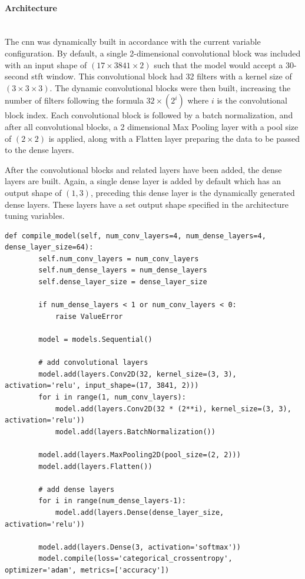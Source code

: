 \documentclass[12pt]{article}
\begin{document}
\paragraph{Architecture}\mbox{}\\


The \acrshort{cnn} was dynamically built in accordance with the current variable configuration. By default, a single 2-dimensional convolutional block was included with an input shape of $(17\times3841\times2)$ such that the model would accept a 30-second \acrshort{stft} window. This convolutional block had 32 filters with a kernel size of $(3\times3\times3)$. The dynamic convolutional blocks were then built, increasing the number of filters following the formula $32 \times (2^i)$ where $i$ is the convolutional block index. Each convolutional block is followed by a batch normalization, and after all convolutional blocks, a 2 dimensional Max Pooling layer with a pool size of $(2\times2)$ is applied, along with a Flatten layer preparing the data to be passed to the dense layers.

After the convolutional blocks and related layers have been added, the dense layers are built. Again, a single dense layer is added by default which has an output shape of $(1, 3)$, preceding this dense layer is the dynamically generated dense layers. These layers have a set output shape specified in the architecture tuning variables.


\begin{lstlisting}[style=pythonstyle, caption={Function which dynamically builds an \acrshort{cnn} model from the specified parameters. Logging has been removed.}, label={lst:compile-model}]
    def compile_model(self, num_conv_layers=4, num_dense_layers=4, dense_layer_size=64):
        self.num_conv_layers = num_conv_layers
        self.num_dense_layers = num_dense_layers 
        self.dense_layer_size = dense_layer_size 

        if num_dense_layers < 1 or num_conv_layers < 0: 
            raise ValueError

        model = models.Sequential()

        # add convolutional layers
        model.add(layers.Conv2D(32, kernel_size=(3, 3), activation='relu', input_shape=(17, 3841, 2)))
        for i in range(1, num_conv_layers):
            model.add(layers.Conv2D(32 * (2**i), kernel_size=(3, 3), activation='relu'))
            model.add(layers.BatchNormalization())

        model.add(layers.MaxPooling2D(pool_size=(2, 2)))
        model.add(layers.Flatten())

        # add dense layers
        for i in range(num_dense_layers-1):
            model.add(layers.Dense(dense_layer_size, activation='relu'))

        model.add(layers.Dense(3, activation='softmax'))
        model.compile(loss='categorical_crossentropy', optimizer='adam', metrics=['accuracy'])
\end{lstlisting}
\end{document}
